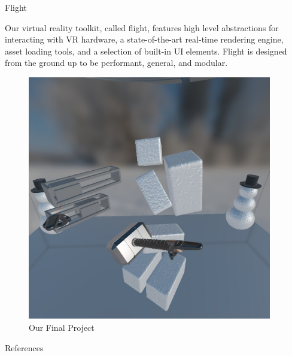 \documentclass[final]{beamer}
\newlength{\sepwid}
\newlength{\onecolwid}
\begin{document}
\begin{frame}[t]
\begin{columns}[t]
            \begin{column}{\sepwid}\end{column} %

            \begin{column}{\onecolwid} %

                \begin{block}{Flight}
                    \setlength{\parskip}{0.5em}

                    Our virtual reality toolkit, called flight, features high
                    level abstractions for interacting with VR hardware, a
                    state-of-the-art real-time rendering engine, asset loading
                    tools, and a selection of built-in UI elements. Flight is
                    designed from the ground up to be performant, general, and
                    modular.

                \end{block}

                \begin{figure}[H]
                    \centering
                    \includegraphics[width=0.9\linewidth]{../report/screenshots/physics_b.jpg}
                    \caption{Our Final Project}\label{fig:project}
                \end{figure}

                \begin{block}{References}
                    \printbibliography
                \end{block}


\end{column}
\end{columns}
\end{frame}
\end{document}

